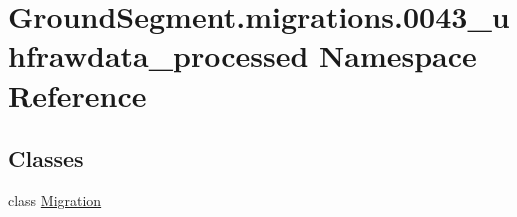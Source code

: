 \hypertarget{namespace_ground_segment_1_1migrations_1_10043__uhfrawdata__processed}{}\section{Ground\+Segment.\+migrations.0043\+\_\+uhfrawdata\+\_\+processed Namespace Reference}
\label{namespace_ground_segment_1_1migrations_1_10043__uhfrawdata__processed}
\subsection*{Classes}
\begin{DoxyCompactItemize}
\item 
class \hyperlink{class_ground_segment_1_1migrations_1_10043__uhfrawdata__processed_1_1_migration}{Migration}
\end{DoxyCompactItemize}
